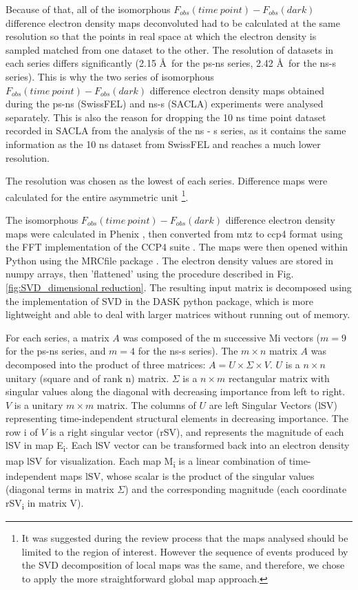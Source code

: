 Because of that, all of the isomorphous \(F_{obs}(time\ point) - F_{obs}(dark)\) difference electron density maps deconvoluted had to be calculated at the same resolution so that the points in real space at which the electron density is sampled matched from one dataset to the other. The resolution of datasets in each series differs significantly (2.15 \AA\ for the ps-ns series, 2.42 \AA\ for the ns-\textmu s series). This is why the two series of isomorphous \(F_{obs}(time\ point) - F_{obs}(dark)\) difference electron density maps obtained during the ps-ns (SwissFEL) and ns-\textmu s (SACLA) experiments were analysed separately. This is also the reason for dropping the 10 ns time point dataset recorded in SACLA from the analysis of the ns - \textmu s series, as it contains the same information as the 10 ns dataset from SwissFEL and reaches a much lower resolution. 

The resolution was chosen as the lowest of each series. Difference maps were calculated for the entire asymmetric unit \footnote{It was suggested during the review process that the maps analysed should be limited to the region of interest. However the sequence of events produced by the SVD decomposition of local maps was the same, and therefore, we chose to apply the more straightforward global map approach.}. 

The isomorphous \(F_{obs}(time\ point) - F_{obs}(dark)\) difference electron density maps were calculated in Phenix \parencite{liebschnerMacromolecularStructureDetermination2019}, then converted from mtz to ccp4 format using the FFT implementation of the CCP4 suite \parencite{agirreCCP4SuiteIntegrative2023}. The maps were then opened within Python using the MRCfile package \parencite{burnleyRecentDevelopmentsCCPEM2017}.  The electron density values are stored in numpy arrays, then 'flattened' using the procedure described in Fig. \ref{fig:SVD_dimensional reduction}. The resulting input matrix is decomposed using the implementation of SVD in the DASK python package, which is more lightweight and able to deal with larger matrices without running out of memory. 

For each series, a matrix \(A\) was composed of the m successive Mi vectors (\(m = 9\) for the ps-ns series, and \(m = 4\) for the ns-\textmu s series). The \(m \times n\) matrix \(A\) was decomposed into the product of three matrices: \(A=U\times \Sigma \times V\). \(U\) is a \(n \times n\) unitary (square and of rank n) matrix. \(\Sigma\) is a \(n \times m\) rectangular matrix with singular values along the diagonal with decreasing importance from left to right. \(V\) is a unitary \(m \times m\) matrix. The columns of \(U\) are left Singular Vectors (lSV) representing time-independent structural elements in decreasing importance. The row i of \(V\) is a right singular vector (rSV), and represents the magnitude of each lSV in map E\textsubscript{i}. Each lSV vector can be transformed back into an electron density map lSV for visualization. Each map M\textsubscript{i} is a linear combination of time-independent maps lSV, whose scalar is the product of the singular values (diagonal terms in matrix \(\Sigma\)) and the corresponding magnitude (each coordinate rSV\textsubscript{i} in matrix V). 

